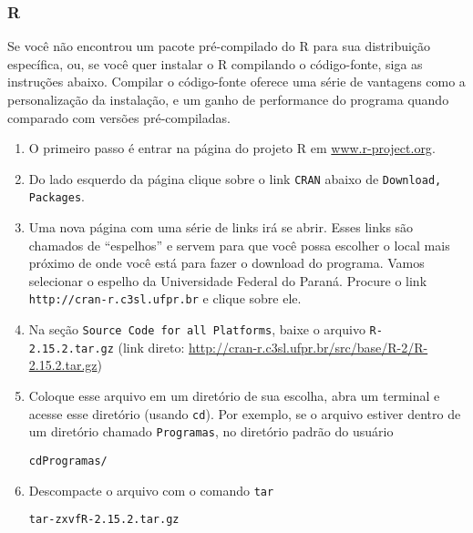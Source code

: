 \documentclass[a4paper,12pt]{article}\usepackage{graphicx, color}
\makeatletter
\newenvironment{kframe}{%
 \def\at@end@of@kframe{}%
 \ifinner\ifhmode%
  \def\at@end@of@kframe{\end{minipage}}%
  \begin{minipage}{\columnwidth}%
 \fi\fi%
 \def\FrameCommand##1{\hskip\@totalleftmargin \hskip-\fboxsep
 \colorbox{shadecolor}{##1}\hskip-\fboxsep
     \hskip-\linewidth \hskip-\@totalleftmargin \hskip\columnwidth}%
 \MakeFramed {\advance\hsize-\width
   \@totalleftmargin\z@ \linewidth\hsize
   \@setminipage}}%
 {\par\unskip\endMakeFramed%
 \at@end@of@kframe}
\newenvironment{knitrout}{}{} %
\providecommand{\R}{\textsf{R}\xspace}
\makeatother
\begin{document}
\subsubsection{\R}

Se você não encontrou um pacote pré-compilado do \R para sua
distribuição específica, ou, se você quer instalar o \R compilando o
código-fonte, siga as instruções abaixo. Compilar o código-fonte oferece
uma série de vantagens como a personalização da instalação, e um ganho
de performance do programa quando comparado com versões pré-compiladas.

\begin{enumerate}
\item O primeiro passo é entrar na página do projeto \R em
\url{www.r-project.org}.
\item Do lado esquerdo da página clique sobre o link \texttt{CRAN}
  abaixo de \texttt{Download, Packages}.
\item Uma nova página com uma série de links irá se abrir. Esses links
  são chamados de ``espelhos'' e servem para que você possa escolher o
  local mais próximo de onde você está para fazer o download do
  programa. Vamos selecionar o espelho da Universidade Federal do
  Paraná. Procure o link \texttt{http://cran-r.c3sl.ufpr.br} e clique sobre
  ele.
\item Na seção \texttt{Source Code for all Platforms}, baixe o arquivo
  \texttt{R-2.15.2.tar.gz} (link direto:
  \url{http://cran-r.c3sl.ufpr.br/src/base/R-2/R-2.15.2.tar.gz})
\item Coloque esse arquivo em um diretório de sua escolha, abra um
  terminal e acesse esse diretório (usando \texttt{cd}). Por exemplo, se
  o arquivo estiver dentro de um diretório chamado \texttt{Programas},
  no diretório padrão do usuário
\begin{knitrout}\small
{}\color{fgcolor}\begin{kframe}
\begin{alltt}
 cd Programas/
\end{alltt}
\end{kframe}
\end{knitrout}

\item Descompacte o arquivo com o comando \texttt{tar}
\begin{knitrout}\small
{}\color{fgcolor}\begin{kframe}
\begin{alltt}
 tar -zxvf R-2.15.2.tar.gz
\end{alltt}
\end{kframe}
\end{knitrout}


\end{enumerate}
\end{document}
